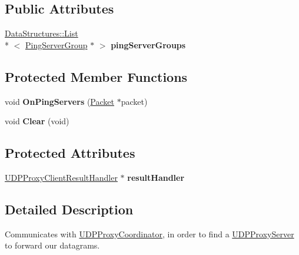 \subsection*{Public Attributes}
\begin{DoxyCompactItemize}
\item 
\hypertarget{class_rak_net_1_1_u_d_p_proxy_client_a37d30913baa4ab9a51b0e097c9feaaf7}{\hyperlink{class_data_structures_1_1_list}{Data\-Structures\-::\-List}\\*
$<$ \hyperlink{struct_rak_net_1_1_u_d_p_proxy_client_1_1_ping_server_group}{Ping\-Server\-Group} $\ast$ $>$ {\bfseries ping\-Server\-Groups}}\label{class_rak_net_1_1_u_d_p_proxy_client_a37d30913baa4ab9a51b0e097c9feaaf7}

\end{DoxyCompactItemize}
\subsection*{Protected Member Functions}
\begin{DoxyCompactItemize}
\item 
\hypertarget{class_rak_net_1_1_u_d_p_proxy_client_a03930c254115da2da2b5bfa8b1c191f3}{void {\bfseries On\-Ping\-Servers} (\hyperlink{struct_rak_net_1_1_packet}{Packet} $\ast$packet)}\label{class_rak_net_1_1_u_d_p_proxy_client_a03930c254115da2da2b5bfa8b1c191f3}

\item 
\hypertarget{class_rak_net_1_1_u_d_p_proxy_client_a1b13dca5b99c7a077dec6fbb0c6b0a3b}{void {\bfseries Clear} (void)}\label{class_rak_net_1_1_u_d_p_proxy_client_a1b13dca5b99c7a077dec6fbb0c6b0a3b}

\end{DoxyCompactItemize}
\subsection*{Protected Attributes}
\begin{DoxyCompactItemize}
\item 
\hypertarget{class_rak_net_1_1_u_d_p_proxy_client_a1c1bdcb07c16ad56894415087da70252}{\hyperlink{struct_rak_net_1_1_u_d_p_proxy_client_result_handler}{U\-D\-P\-Proxy\-Client\-Result\-Handler} $\ast$ {\bfseries result\-Handler}}\label{class_rak_net_1_1_u_d_p_proxy_client_a1c1bdcb07c16ad56894415087da70252}

\end{DoxyCompactItemize}


\subsection{Detailed Description}
Communicates with \hyperlink{class_rak_net_1_1_u_d_p_proxy_coordinator}{U\-D\-P\-Proxy\-Coordinator}, in order to find a \hyperlink{class_rak_net_1_1_u_d_p_proxy_server}{U\-D\-P\-Proxy\-Server} to forward our datagrams. 

